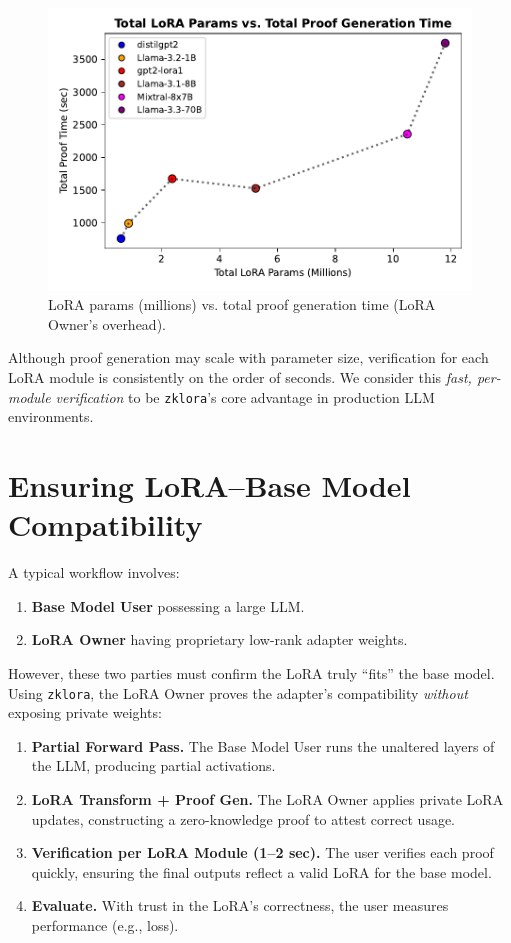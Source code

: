 \documentclass[11pt]{article}
\begin{document}
\begin{figure}[ht]
    \centering
    \includegraphics[width=0.58\linewidth]{figs/fig_proof.pdf}
    \caption{LoRA params (millions) vs. total proof generation time (LoRA Owner’s overhead).}
    \label{fig:proof}
\end{figure}

Although proof generation may scale with parameter size, verification for each LoRA module is consistently on the order of seconds. We consider this \emph{fast, per-module verification} to be \texttt{zklora}’s core advantage in production LLM environments.

\section{Ensuring LoRA–Base Model Compatibility}

A typical workflow involves:
\begin{enumerate}
    \item \textbf{Base Model User} possessing a large LLM. 
    \item \textbf{LoRA Owner} having proprietary low-rank adapter weights. 
\end{enumerate}
However, these two parties must confirm the LoRA truly “fits” the base model. Using \texttt{zklora}, the LoRA Owner proves the adapter’s compatibility \emph{without} exposing private weights:

\begin{enumerate}
    \item \textbf{Partial Forward Pass.}
    The Base Model User runs the unaltered layers of the LLM, producing partial activations.

    \item \textbf{LoRA Transform + Proof Gen.}
    The LoRA Owner applies private LoRA updates, constructing a zero-knowledge proof to attest correct usage.

    \item \textbf{Verification per LoRA Module (1--2 sec).}
    The user verifies each proof quickly, ensuring the final outputs reflect a valid LoRA for the base model.

    \item \textbf{Evaluate.}
    With trust in the LoRA’s correctness, the user measures performance (e.g., loss).
\end{enumerate}
\end{document}
